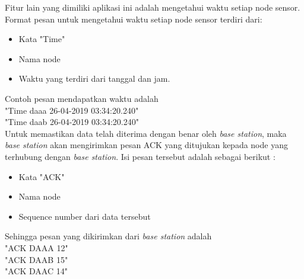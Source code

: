 Fitur lain yang dimiliki aplikasi ini adalah mengetahui waktu setiap node sensor. Format pesan untuk mengetahui waktu setiap node sensor terdiri dari:
\begin{itemize}
    \item Kata "Time"
    \item Nama node
    \item Waktu yang terdiri dari tanggal dan jam.
\end{itemize}
Contoh pesan mendapatkan waktu adalah\\
"Time daaa 26-04-2019 03:34:20.240"\\
"Time daab 26-04-2019 03:34:20.240" \\

Untuk memastikan data telah diterima dengan benar oleh \textit{base station}, maka \textit{base station} akan mengirimkan pesan ACK yang ditujukan kepada node yang terhubung dengan \textit{base station}. Isi pesan tersebut adalah sebagai berikut :
\begin{itemize}
    \item Kata "ACK"
    \item Nama node
    \item Sequence number dari data tersebut
\end{itemize}
Sehingga pesan yang dikirimkan dari \textit{base station} adalah\\
"ACK DAAA 12"\\
"ACK DAAB 15"\\
"ACK DAAC 14"